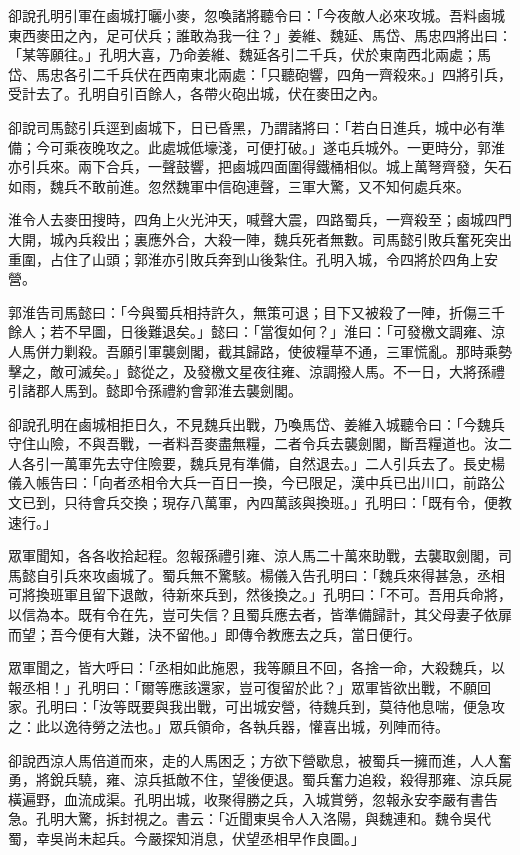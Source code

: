 卻說孔明引軍在鹵城打曬小麥，忽喚諸將聽令曰：「今夜敵人必來攻城。吾料鹵城東西麥田之內，足可伏兵；誰敢為我一往？」姜維、魏延、馬岱、馬忠四將出曰：「某等願往。」孔明大喜，乃命姜維、魏延各引二千兵，伏於東南西北兩處；馬岱、馬忠各引二千兵伏在西南東北兩處：「只聽砲響，四角一齊殺來。」四將引兵，受計去了。孔明自引百餘人，各帶火砲出城，伏在麥田之內。

卻說司馬懿引兵逕到鹵城下，日已昏黑，乃謂諸將曰：「若白日進兵，城中必有準備；今可乘夜晚攻之。此處城低壕淺，可便打破。」遂屯兵城外。一更時分，郭淮亦引兵來。兩下合兵，一聲鼓響，把鹵城四面圍得鐵桶相似。城上萬弩齊發，矢石如雨，魏兵不敢前進。忽然魏軍中信砲連聲，三軍大驚，又不知何處兵來。

淮令人去麥田搜時，四角上火光沖天，喊聲大震，四路蜀兵，一齊殺至；鹵城四門大開，城內兵殺出；裏應外合，大殺一陣，魏兵死者無數。司馬懿引敗兵奮死突出重圍，占住了山頭；郭淮亦引敗兵奔到山後紮住。孔明入城，令四將於四角上安營。

郭淮告司馬懿曰：「今與蜀兵相持許久，無策可退；目下又被殺了一陣，折傷三千餘人；若不早圖，日後難退矣。」懿曰：「當復如何？」淮曰：「可發檄文調雍、涼人馬併力剿殺。吾願引軍襲劍閣，截其歸路，使彼糧草不通，三軍慌亂。那時乘勢擊之，敵可滅矣。」懿從之，及發檄文星夜往雍、涼調撥人馬。不一日，大將孫禮引諸郡人馬到。懿即令孫禮約會郭淮去襲劍閣。

卻說孔明在鹵城相拒日久，不見魏兵出戰，乃喚馬岱、姜維入城聽令曰：「今魏兵守住山險，不與吾戰，一者料吾麥盡無糧，二者令兵去襲劍閣，斷吾糧道也。汝二人各引一萬軍先去守住險要，魏兵見有準備，自然退去。」二人引兵去了。長史楊儀入帳告曰：「向者丞相令大兵一百日一換，今已限足，漢中兵已出川口，前路公文已到，只待會兵交換；現存八萬軍，內四萬該與換班。」孔明曰：「既有令，便教速行。」

眾軍聞知，各各收拾起程。忽報孫禮引雍、涼人馬二十萬來助戰，去襲取劍閣，司馬懿自引兵來攻鹵城了。蜀兵無不驚駭。楊儀入告孔明曰：「魏兵來得甚急，丞相可將換班軍且留下退敵，待新來兵到，然後換之。」孔明曰：「不可。吾用兵命將，以信為本。既有令在先，豈可失信？且蜀兵應去者，皆準備歸計，其父母妻子依扉而望；吾今便有大難，決不留他。」即傳令教應去之兵，當日便行。

眾軍聞之，皆大呼曰：「丞相如此施恩，我等願且不回，各捨一命，大殺魏兵，以報丞相！」孔明曰：「爾等應該還家，豈可復留於此？」眾軍皆欲出戰，不願回家。孔明曰：「汝等既要與我出戰，可出城安營，待魏兵到，莫待他息喘，便急攻之：此以逸待勞之法也。」眾兵領命，各執兵器，懽喜出城，列陣而待。

卻說西涼人馬倍道而來，走的人馬困乏；方欲下營歇息，被蜀兵一擁而進，人人奮勇，將銳兵驍，雍、涼兵抵敵不住，望後便退。蜀兵奮力追殺，殺得那雍、涼兵屍橫遍野，血流成渠。孔明出城，收聚得勝之兵，入城賞勞，忽報永安李嚴有書告急。孔明大驚，拆封視之。書云：「近聞東吳令人入洛陽，與魏連和。魏令吳代蜀，幸吳尚未起兵。今嚴探知消息，伏望丞相早作良圖。」


